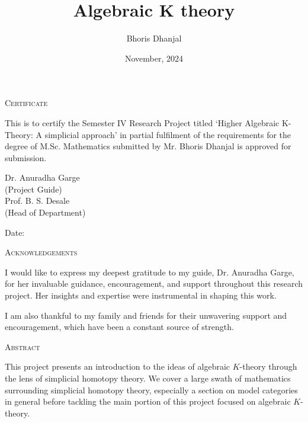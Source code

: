 \documentclass[12pt]{report}
\title{Algebraic K theory}
\author{Bhoris Dhanjal}
\date{November, 2024}
\makeatletter
\numberwithin{equation}{section}
\newcommand\frontmatter{%
	\cleardoublepage
	\@mainmatterfalse
	\pagenumbering{roman}}
\makeatother
\begin{document}
	

	\frontmatter
	
	\begin{center}
		

		{\LARGE {\textsc{Certificate}}}\\[2.5cm]
	\end{center}
	\normalsize This is to certify the Semester IV Research Project titled `Higher Algebraic K-Theory: A simplicial approach' in partial fulfilment of the requirements for the degree of M.Sc. Mathematics submitted by Mr. Bhoris Dhanjal is approved for submission.
	

	
	\vfill
	
	
	\begin{flushright}
		Dr. Anuradha Garge\\
		(Project Guide)\\[1.5cm]
		Prof. B. S. Desale\\
		(Head of Department)\\
	\end{flushright}
	
	\begin{flushleft}
		Date:
	\end{flushleft}
	\clearpage
	
	\begin{center}
	
	
	{\LARGE {\textsc{Acknowledgements}}}\\[1cm]
\end{center}
I would like to express my deepest gratitude to my guide, Dr. Anuradha Garge, for her invaluable guidance, encouragement, and support throughout this research project. Her insights and expertise were instrumental in shaping this work.

I am also thankful to my family and friends for their unwavering support and encouragement, which have been a constant source of strength.
	\clearpage
	\begin{center}
		
		
		{\LARGE {\textsc{Abstract}}}\\[1cm]
	\end{center}
	This project presents an introduction to the ideas of algebraic \( K \)-theory through the lens of simplicial homotopy theory. We cover a large swath of mathematics surrounding simplicial homotopy theory, especially a section on model categories in general before tackling the main portion of this project focused on algebraic \( K \)-theory.
	
\end{document}
